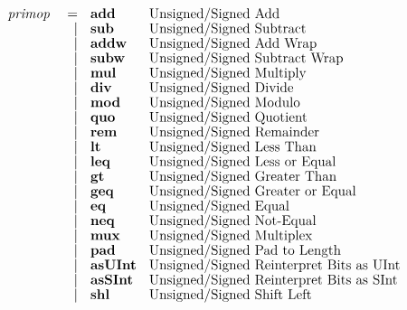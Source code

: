 \documentclass[12pt]{article}
\begin{document}
\[
{ \fontsize{11pt}{1.15em}\selectfont
\begin{array}{rrll}
\pd{primop}   &=               &\kws{add}            &\text{Unsigned/Signed Add}\\
              &\vert           &\kws{sub}            &\text{Unsigned/Signed Subtract}\\
              &\vert           &\kws{addw}           &\text{Unsigned/Signed Add Wrap}\\
              &\vert           &\kws{subw}           &\text{Unsigned/Signed Subtract Wrap}\\
              &\vert           &\kws{mul}            &\text{Unsigned/Signed Multiply}\\
              &\vert           &\kws{div}            &\text{Unsigned/Signed Divide}\\
              &\vert           &\kws{mod}            &\text{Unsigned/Signed Modulo}\\
              &\vert           &\kws{quo}            &\text{Unsigned/Signed Quotient}\\
              &\vert           &\kws{rem}            &\text{Unsigned/Signed Remainder}\\
              &\vert           &\kws{lt}             &\text{Unsigned/Signed Less Than}\\
              &\vert           &\kws{leq}            &\text{Unsigned/Signed Less or Equal}\\
              &\vert           &\kws{gt}             &\text{Unsigned/Signed Greater Than}\\
              &\vert           &\kws{geq}            &\text{Unsigned/Signed Greater or Equal}\\
              &\vert           &\kws{eq}             &\text{Unsigned/Signed Equal}\\
              &\vert           &\kws{neq}            &\text{Unsigned/Signed Not-Equal}\\
              &\vert           &\kws{mux}            &\text{Unsigned/Signed Multiplex}\\
              &\vert           &\kws{pad}            &\text{Unsigned/Signed Pad to Length}\\
              &\vert           &\kws{asUInt}         &\text{Unsigned/Signed Reinterpret Bits as UInt}\\
              &\vert           &\kws{asSInt}         &\text{Unsigned/Signed Reinterpret Bits as SInt}\\
              &\vert           &\kws{shl}            &\text{Unsigned/Signed Shift Left}\\

\end{array}}\]
\end{document}
